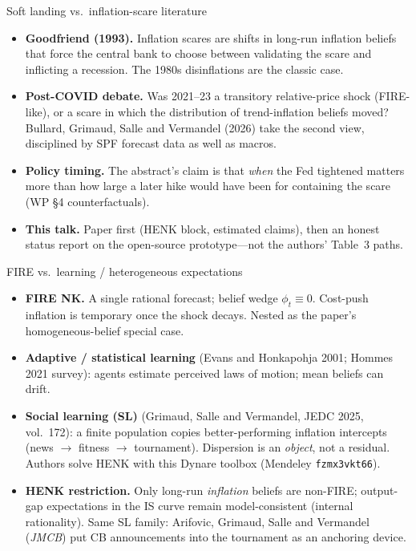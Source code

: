 \documentclass[11pt,aspectratio=169]{beamer}
\newcommand{\paper}{Bullard, Grimaud, Salle and Vermandel (2026)}
\begin{document}
\begin{frame}{Soft landing vs.\ inflation-scare literature}
  \begin{itemize}
    \item \textbf{Goodfriend (1993).}
          Inflation scares are shifts in long-run inflation beliefs that
          force the central bank to choose between validating the scare
          and inflicting a recession. The 1980s disinflations are the
          classic case.
    \item \textbf{Post-COVID debate.}
          Was 2021--23 a transitory relative-price shock (FIRE-like), or
          a scare in which the distribution of trend-inflation beliefs
          moved? \paper{} take the second view, disciplined by SPF
          forecast data as well as macros.
    \item \textbf{Policy timing.}
          The abstract's claim is that \emph{when} the Fed tightened
          matters more than how large a later hike would have been for
          containing the scare (WP \S4 counterfactuals).
    \item \textbf{This talk.}
          Paper first (HENK block, estimated claims), then an honest
          status report on the open-source prototype---not the authors'
          Table~3 paths.
  \end{itemize}
\end{frame}

\begin{frame}{FIRE vs.\ learning / heterogeneous expectations}
  \begin{itemize}
    \item \textbf{FIRE NK.}
          A single rational forecast; belief wedge $\phi_t\equiv 0$.
          Cost-push inflation is temporary once the shock decays.
          Nested as the paper's homogeneous-belief special case.
    \item \textbf{Adaptive / statistical learning}
          (Evans and Honkapohja 2001; Hommes 2021 survey):
          agents estimate perceived laws of motion; mean beliefs can drift.
    \item \textbf{Social learning (SL)}
          (Grimaud, Salle and Vermandel, JEDC 2025, vol.~172):
          a finite population copies better-performing inflation intercepts
          (news $\to$ fitness $\to$ tournament). Dispersion is an
          \emph{object}, not a residual. Authors solve HENK with this
          Dynare toolbox (Mendeley \texttt{fzmx3vkt66}).
    \item \textbf{HENK restriction.}
          Only long-run \emph{inflation} beliefs are non-FIRE; output-gap
          expectations in the IS curve remain model-consistent
          (internal rationality). Same SL family: Arifovic, Grimaud, Salle
          and Vermandel (\emph{JMCB}) put CB announcements into the
          tournament as an anchoring device.
  \end{itemize}
\end{frame}
\end{document}
